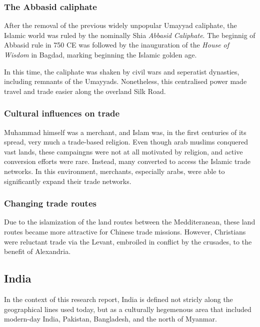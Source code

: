\documentclass[11pt, a4paper, headings=standardclasses]{scrartcl}
\begin{document}
\subsubsection{The Abbasid caliphate}

After the removal of the previous widely unpopular\autocite{Umayyad} Umayyad caliphate, the Islamic world was ruled by the nominally Shia \emph{Abbasid Caliphate}. The beginnig of Abbasid rule in 750 CE was followed by the inauguration of the \emph{House of Wisdom} in Bagdad, marking beginning the Islamic golden age.\autocite{Abbasid}

In this time, the caliphate was shaken by civil wars and seperatist dynasties, including remnants of the Umayyads.\autocite[Section \textit{End}]{Umayyad} Nonetheless, this centralised power made travel and trade easier along the overland Silk Road.

\subsubsection{Cultural influences on trade}

Muhammad himself was a merchant\autocite{Muhammad}, and Islam was, in the first centuries of its spread, very much a trade-based religion. Even though arab muslims conquered vast lands, these campaingns were not at all motivated by religion\autocite[200]{Lapidus}, and active conversion efforts were rare. Instead, many converted to access the Islamic trade networks.\autocite{SilkRoadIslam} In this environment, merchants, especially arabs, were able to significantly expand their trade networks.

\subsubsection{Changing trade routes}

Due to the islamization of the land routes between the Medditeranean, these land routes became more attractive for Chinese trade missions. However, Christians were reluctant trade via the Levant, embroiled in conflict by the crusades, to the benefit of Alexandria.\autocite[Paragraph 5]{UN}

\subsection{India}

In the context of this research report, India is defined not stricly along the geographical lines used today, but as a culturally hegemenous area that included modern-day India, Pakistan, Bangladesh, and the north of Myanmar.
\end{document}
